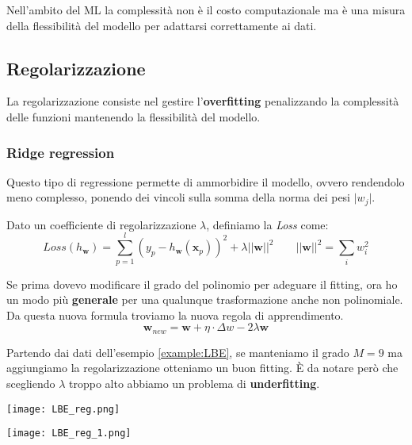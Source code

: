 \begin{definition}[Complessità]
	Nell'ambito del ML la complessità non è il costo computazionale ma è una misura della flessibilità del modello per adattarsi correttamente ai dati.
\end{definition}
\newpage
\subsection{Regolarizzazione}
La regolarizzazione consiste nel gestire l'\textbf{overfitting} penalizzando la complessità delle funzioni mantenendo la flessibilità del modello.
\subsubsection{Ridge regression}
Questo tipo di regressione permette di ammorbidire il modello, ovvero rendendolo meno complesso, ponendo dei vincoli sulla somma della norma dei pesi $\lvert w_j \rvert$.
\begin{definition}
	Dato un coefficiente di regolarizzazione $\lambda$, definiamo la \textit{Loss} come:
	\begin{equation}
		Loss(h_\mathbf{w})=\sum_{p=1}^{l}(y_p-h_\mathbf{w}(\mathbf{x}_p))^2 + \lambda \lvert\lvert \mathbf{w}\rvert\rvert^2 \quad\quad \lvert\lvert \mathbf{w}\rvert\rvert^2 = \sum_i w_i^2
	\end{equation}
\end{definition}
Se prima dovevo modificare il grado del polinomio per adeguare il fitting, ora ho un modo più \textbf{generale} per una qualunque trasformazione anche non polinomiale.\\
Da questa nuova formula troviamo la nuova regola di apprendimento.
\begin{equation}
	\mathbf{w}_{new} = \mathbf{w} + \eta \cdot \Delta w - 2 \lambda \mathbf{w}
\end{equation}
\begin{example}
	Partendo dai dati dell'esempio \ref{example:LBE}, se manteniamo il grado $M=9$ ma aggiungiamo la regolarizzazione otteniamo un buon fitting. È da notare però che scegliendo $\lambda$ troppo alto abbiamo un problema di \textbf{underfitting}.
	\begin{center}
		\begin{minipage}{0.48\linewidth}
			\centering
			\texttt{[image: LBE\_reg.png]}
		\end{minipage}
		\begin{minipage}{0.48\linewidth}
			\centering
			\texttt{[image: LBE\_reg\_1.png]}
		\end{minipage}
	\end{center}
\end{example}

